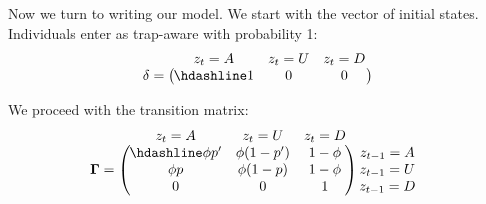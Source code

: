 \documentclass[
  12pt,
]{krantz}
\begin{document}
Now we turn to writing our model. We start with the vector of initial states. Individuals enter as trap-aware with probability 1:
\[\begin{matrix}
& \\
\mathbf{\delta} =
\left ( \vphantom{ \begin{matrix} 12 \end{matrix} } \right .
\end{matrix}
\hspace{-1.2em}
\begin{matrix}
z_t=A & z_t=U & z_t=D \\ \hdashline
1 & 0 & 0\\
\end{matrix}
\hspace{-0.2em}
\begin{matrix}
& \\
\left . \vphantom{ \begin{matrix} 12 \end{matrix} } \right )
\begin{matrix}
\end{matrix}
\end{matrix}\]

We proceed with the transition matrix:
\[\begin{matrix}
& \\
\mathbf{\Gamma} =
\left ( \vphantom{ \begin{matrix} 12 \\ 12 \\ 12 \end{matrix} } \right .
\end{matrix}
\hspace{-1.2em}
\begin{matrix}
z_t=A & z_t=U & z_t=D \\ \hdashline
\phi p' & \phi (1-p') & 1 - \phi\\
\phi p & \phi (1-p) & 1 - \phi\\
0 & 0 & 1
\end{matrix}
\hspace{-0.2em}
\begin{matrix}
& \\
\left . \vphantom{ \begin{matrix} 12 \\ 12 \\ 12 \end{matrix} } \right )
\begin{matrix}
z_{t-1}=A \\ z_{t-1}=U \\ z_{t-1}=D
\end{matrix}
\end{matrix}\]
\end{document}
